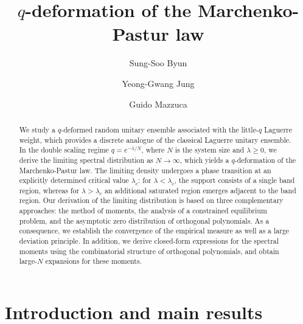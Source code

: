 \documentclass{amsart}
\theoremstyle{plain}
\theoremstyle{remark}
\numberwithin{equation}{section}
\begin{document}
\title[$q$-deformation of the Marchenko-Pastur law]{$q$-deformation of the Marchenko-Pastur law}
\author{Sung-Soo Byun}
\address{Department of Mathematical Sciences and Research Institute of Mathematics, Seoul National University, Seoul 151-747, Republic of Korea}

\author{Yeong-Gwang Jung}
\address{Department of Mathematical Sciences, Seoul National University, Seoul 151-747, Republic of Korea}

\author{Guido Mazzuca}
\address{Department of mathematics, Tulane University, 6823 St Charles Ave, New Orleans, LA 70118, USA} 

\begin{abstract}
We study a $q$-deformed random unitary ensemble associated with the little-$q$ Laguerre weight, which provides a discrete analogue of the classical Laguerre unitary ensemble. In the double scaling regime $q=e^{-\lambda/N}$, where $N$ is the system size and $\lambda \ge 0$, we derive the limiting spectral distribution as $N\to \infty$, which yields a $q$-deformation of the Marchenko-Pastur law. The limiting density undergoes a phase transition at an explicitly determined critical value $\lambda_c$: for $\lambda<\lambda_c$, the support consists of a single band region, whereas for $\lambda>\lambda_c$ an additional saturated region emerges adjacent to the band region. 
Our derivation of the limiting distribution is based on three complementary approaches: the method of moments, the analysis of a constrained equilibrium problem, and the asymptotic zero distribution of orthogonal polynomials. As a consequence, we establish the convergence of the empirical measure as well as a large deviation principle. In addition, we derive closed-form expressions for the spectral moments using the combinatorial structure of orthogonal polynomials, and obtain large-$N$ expansions for these moments.
\end{abstract}

\maketitle


\section{Introduction and main results}
 
\end{document}
